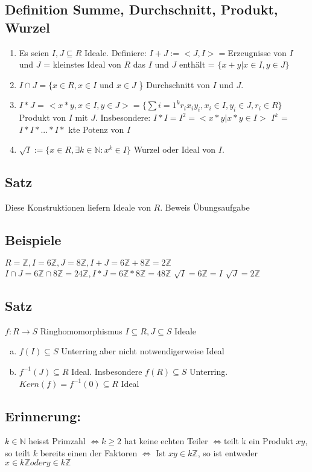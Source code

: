 \documentclass[12pt,a4paper,ngerman]{scrreprt}
\begin{document}
\subsection{Definition Summe, Durchschnitt, Produkt, Wurzel}
\begin{enumerate}[]
\item Es seien $I,J \subseteq R$ Ideale. Definiere: $I+J := <J,I> = $Erzeugnisse von $I$ und $J$ = kleinstes Ideal von $R$ das $I$ und $J$ enthält
= $\{x+y | x \in I, y \in J\}$
\item $I \cap J = \{x \in R, x \in I$ und $x \in J$ \} Durchschnitt von $I$ und $J$.
\item $I*J$ = $<x*y, x\in I, y \in J> = \{\sum{i=1}^k r_ix_iy_i, x_i \in I, y_i \in J, r_i \in R\}$
Produkt von $I$ mit $J$. Insbesondere: $I*I = I^2 = <x*y | x*y\in I>$
$I^k$ = $I*I*...*I*$ kte Potenz von $I$
\item $\sqrt{I} :=\{x\in R, \exists k\in \mathbb{N}: x^k \in I\}$ Wurzel oder Ideal von $I$.
\end{enumerate}

\subsection{Satz}
Diese Konstruktionen liefern Ideale von $R$. Beweis Übungsaufgabe
\subsection{Beispiele}
$R = \mathbb{Z}, I = 6\mathbb{Z}, J = 8\mathbb{Z}, I+J = 6\mathbb{Z} + 8\mathbb{Z} = 2 \mathbb{Z}$
$I \cap J = 6\mathbb{Z} \cap 8\mathbb{Z} = 24 \mathbb{Z}, I*J = 6\mathbb{Z}*8\mathbb{Z} = 48\mathbb{Z}$
$\sqrt{I} = 6\mathbb{Z} = I$ $\sqrt{J} = 2\mathbb{Z}$

\subsection{Satz}
$f: R\to S$ Ringhomomorphismus $I \subseteq R, J \subseteq S $ Ideale
\begin{enumerate}[(a)]
\item $f(I) \subseteq S$ Unterring aber nicht notwendigerweise Ideal
\item $f^{-1}(J) \subseteq R $ Ideal. Insbesondere $f(R) \subseteq S$ Unterring. $Kern(f) = f^{-1}(0) \subseteq R$ Ideal
\end{enumerate}

\subsection{Erinnerung:}
$k \in \mathbb{N}$ heisst Primzahl $\Leftrightarrow k \geq 2$ hat keine echten Teiler 
$\Leftrightarrow $teilt k ein Produkt $xy$, so teilt $k$ bereits einen der Faktoren 
$\Leftrightarrow$ Ist $xy \in k \mathbb{Z}$, so ist entweder $x \in k \mathbb{Z} oder y \in k \mathbb{Z}$
\end{document}
